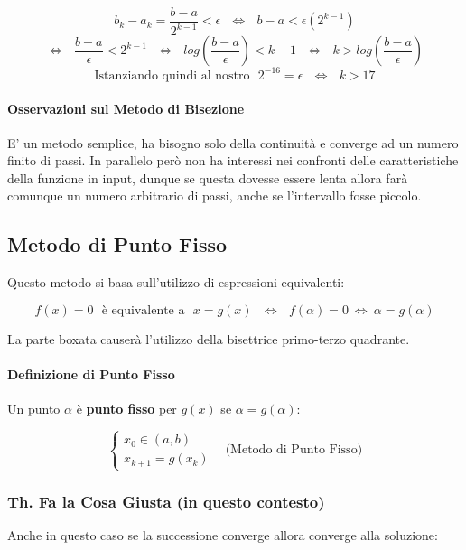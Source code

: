 \documentclass{article}
\begin{document}
\[ b_{k} - a_{k} = \frac{b-a}{2^{k-1}} < \epsilon \:\:\: \Leftrightarrow \:\:\: b-a < \epsilon(2^{k-1}) \]
\[ \Leftrightarrow \:\:\: \frac{b-a}{\epsilon} < 2^{k-1} \:\:\: \Leftrightarrow \:\:\: log(\frac{b-a}{\epsilon}) < k-1 \:\:\:  \Leftrightarrow \:\:\: k > log(\frac{b-a}{\epsilon})\]
\[ \text{Istanziando quindi al nostro} \:\:\: 2^{-16} = \epsilon \:\:\: \Leftrightarrow \:\:\: k > 17 \]

\paragraph{Osservazioni sul Metodo di Bisezione} E' un metodo semplice, ha bisogno solo della continuità e converge ad un numero finito di passi. In parallelo però non ha interessi nei confronti delle caratteristiche della funzione in input, dunque se questa dovesse essere lenta allora farà comunque un numero arbitrario di passi, anche se l'intervallo fosse piccolo.  

\newpage

\subsection{Metodo di Punto Fisso}

Questo metodo si basa sull'utilizzo di espressioni equivalenti:

\[ f(x) = 0 \:\:\: \text{è equivalente a} \:\:\: \boxed{x = g(x)} \:\:\: \Leftrightarrow \:\:\: f(\alpha) = 0 \: \Leftrightarrow \: \alpha = g(\alpha) \]

La parte boxata causerà l'utilizzo della bisettrice primo-terzo quadrante.

\paragraph{Definizione di Punto Fisso} Un punto $\alpha$ è \textbf{punto fisso} per $g(x)$ se $\alpha = g(\alpha)$:

\[ \left\{ \begin{array}{rcl}
    x_{0} \in (a,b) \\
    x_{k+1} = g(x_{k})
    \end{array}\right.
    \:\:\:\: \text{(Metodo di Punto Fisso)}
\]

\subsubsection{Th. Fa la Cosa Giusta (in questo contesto)}

Anche in questo caso se la successione converge allora converge alla soluzione:
\end{document}

